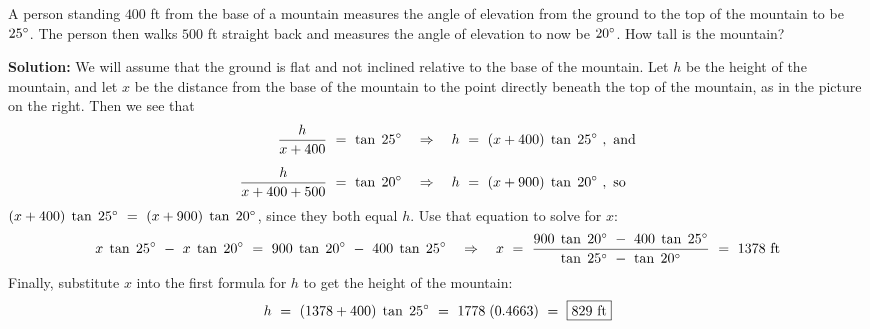 \begin{exmp}\label{exmp:mountain}
 A person standing $400$ ft from the base of a mountain measures the angle of elevation from the
 ground to the top of the mountain to be $25^\circ$. The person then walks $500$ ft straight back
 and measures the angle of elevation to now be $20^\circ$. How tall is the mountain?
 \par\noindent\textbf{Solution:} We will assume that the ground is flat and not inclined relative to
 the base of the mountain. Let $h$ be the height of the mountain, and let $x$ be the distance from
 the base of the mountain to the point directly beneath the top of the mountain, as in the picture
 on the right. Then we see that
 \begin{align*}
  \frac{h}{x + 400} ~=~ \tan\;25^\circ \quad &\Rightarrow \quad h ~=~ (x + 400)\;\tan\;25^\circ
   ~,~\text{and}\\[5pt]
  \frac{h}{x + 400 + 500} ~=~ \tan\;20^\circ \quad &\Rightarrow \quad h ~=~
   (x + 900)\;\tan\;20^\circ ~,~\text{so}
 \end{align*}
$(x + 400)\;\tan\;25^\circ ~=~ (x + 900)\;\tan\;20^\circ$, since they both equal $h$. Use that
equation to solve for $x$:
\begin{displaymath}
 x\;\tan\;25^\circ ~-~ x\;\tan\;20^\circ ~=~ 900\;\tan\;20^\circ ~-~ 400\;\tan\;25^\circ
 \quad\Rightarrow\quad
 x ~=~ \frac{900\;\tan\;20^\circ ~-~ 400\;\tan\;25^\circ}{\tan\;25^\circ ~-~ \tan\;20^\circ}
  ~=~ 1378~ \text{ft}
\end{displaymath}
Finally, substitute $x$ into the first formula for $h$ to get the height of the mountain:
\begin{displaymath}
h ~=~ (1378 + 400)\;\tan\;25^\circ ~=~ 1778\;(0.4663) ~=~ \boxed{829~ \text{ft}}
\end{displaymath}
\end{exmp}
